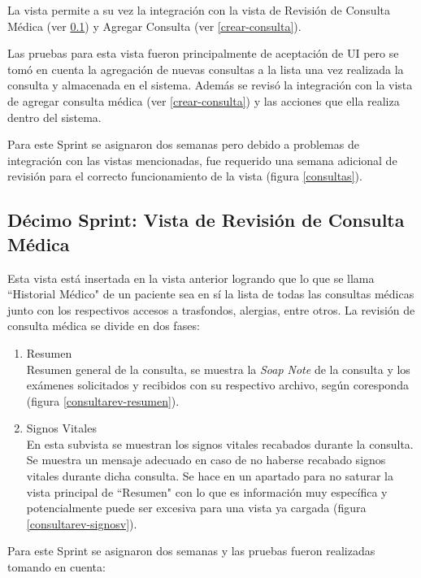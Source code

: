     La vista permite a su vez la integración con la vista de Revisión de Consulta Médica (ver \ref{revisar-consulta}) y Agregar Consulta (ver \ref{crear-consulta}).
    
    Las pruebas para esta vista fueron principalmente de aceptación de UI pero se tomó en cuenta la agregación de nuevas consultas a la lista una vez realizada la consulta y almacenada en el sistema. Además se revisó la integración con la vista de agregar consulta médica (ver \ref{crear-consulta}) y las acciones que ella realiza dentro del sistema.
    
    Para este Sprint se asignaron dos semanas pero debido a problemas de integración con las vistas mencionadas, fue requerido una semana adicional de revisión para el correcto funcionamiento de la vista (figura \ref{consultas}).
    
    \subsection{Décimo Sprint: Vista de Revisión de Consulta Médica}
    \label{revisar-consulta}
    Esta vista está insertada en la vista anterior logrando que lo que se llama ``Historial Médico" de un paciente sea en sí la lista de todas las consultas médicas junto con los respectivos accesos a trasfondos, alergias, entre otros. La revisión de consulta médica se divide en dos fases:
    
    \begin{enumerate}
        \item Resumen\\
        Resumen general de la consulta, se muestra la \textit{Soap Note} de la consulta y los exámenes solicitados y recibidos con su respectivo archivo, según coresponda (figura \ref{consultarev-resumen}).
        \item Signos Vitales\\
        En esta subvista se muestran los signos vitales recabados durante la consulta. Se muestra un mensaje adecuado en caso de no haberse recabado signos vitales durante dicha consulta. Se hace en un apartado para no saturar la vista principal de ``Resumen" con lo que es información muy específica y potencialmente puede ser excesiva para una vista ya cargada (figura \ref{consultarev-signosv}).
    \end{enumerate}
    
    Para este Sprint se asignaron dos semanas y las pruebas fueron realizadas tomando en cuenta:
    

